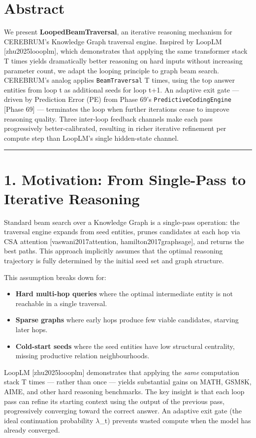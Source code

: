 
\section*{Abstract}

We present \textbf{LoopedBeamTraversal}, an iterative reasoning mechanism for CEREBRUM's Knowledge Graph traversal engine. Inspired by LoopLM [zhu2025loooplm], which demonstrates that applying the same transformer stack T times yields dramatically better reasoning on hard inputs without increasing parameter count, we adapt the looping principle to graph beam search. CEREBRUM's analog applies \texttt{BeamTraversal} T times, using the top answer entities from loop t as additional seeds for loop t+1. An adaptive exit gate --- driven by Prediction Error (PE) from Phase 69's \texttt{PredictiveCodingEngine} [Phase 69] --- terminates the loop when further iterations cease to improve reasoning quality. Three inter-loop feedback channels make each pass progressively better-calibrated, resulting in richer iterative refinement per compute step than LoopLM's single hidden-state channel.

\medskip\noindent\rule{\linewidth}{0.4pt}\medskip

\section*{1. Motivation: From Single-Pass to Iterative Reasoning}

Standard beam search over a Knowledge Graph is a single-pass operation: the traversal engine expands from seed entities, prunes candidates at each hop via CSA attention [vaswani2017attention, hamilton2017graphsage], and returns the best paths. This approach implicitly assumes that the optimal reasoning trajectory is fully determined by the initial seed set and graph structure.

This assumption breaks down for:
\begin{itemize}
  \item \textbf{Hard multi-hop queries} where the optimal intermediate entity is not reachable in a single traversal.
  \item \textbf{Sparse graphs} where early hops produce few viable candidates, starving later hops.
  \item \textbf{Cold-start seeds} where the seed entities have low structural centrality, missing productive relation neighbourhoods.
\end{itemize}


LoopLM [zhu2025loooplm] demonstrates that applying the \textit{same} computation stack T times --- rather than once --- yields substantial gains on MATH, GSM8K, AIME, and other hard reasoning benchmarks. The key insight is that each loop pass can refine its starting context using the output of the previous pass, progressively converging toward the correct answer. An adaptive exit gate (the ideal continuation probability $\lambda$_t) prevents wasted compute when the model has already converged.

